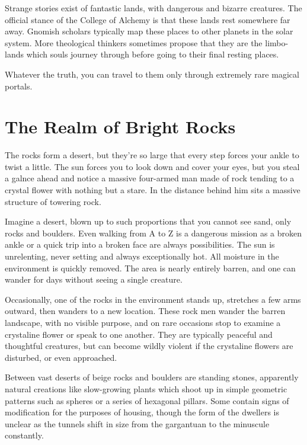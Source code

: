 Strange stories exist of fantastic lands, with dangerous and bizarre creatures.  The official stance of the College of Alchemy is that these lands rest somewhere far away.  Gnomish scholars typically map these places to other planets in the solar system.  More theological thinkers sometimes propose that they are the limbo-lands which souls journey through before going to their final resting places.

Whatever the truth, you can travel to them only through extremely rare magical portals.

\section{The Realm of Bright Rocks}

\begin{boxtext}
	The rocks form a desert, but they're so large that every step forces your ankle to twist a little.  The sun forces you to look down and cover your eyes, but you steal a galnce ahead and notice a massive four-armed man made of rock tending to a crystal flower with nothing but a stare.  In the distance behind him sits a massive structure of towering rock.
\end{boxtext}

Imagine a desert, blown up to such proportions that you cannot see sand, only rocks and boulders.  Even walking from A to Z is a dangerous mission as a broken ankle or a quick trip into a broken face are always possibilities.  The sun is unrelenting, never setting and always exceptionally hot.  All moisture in the environment is quickly removed.  The area is nearly entirely barren, and one can wander for days without seeing a single creature.

Occasionally, one of the rocks in the environment stands up, stretches a few arms outward, then wanders to a new location.  These rock men wander the barren landscape, with no visible purpose, and on rare occasions stop to examine a crystaline flower or speak to one another.  They are typically peaceful and thoughtful creatures, but can become wildly violent if the crystaline flowers are disturbed, or even approached.

Between vast deserts of beige rocks and boulders are standing stones, apparently natural creations like slow-growing plants which shoot up in simple geometric patterns such as spheres or a series of hexagonal pillars.  Some contain signs of modification for the purposes of housing, though the form of the dwellers is unclear as the tunnels shift in size from the gargantuan to the minuscule constantly.

